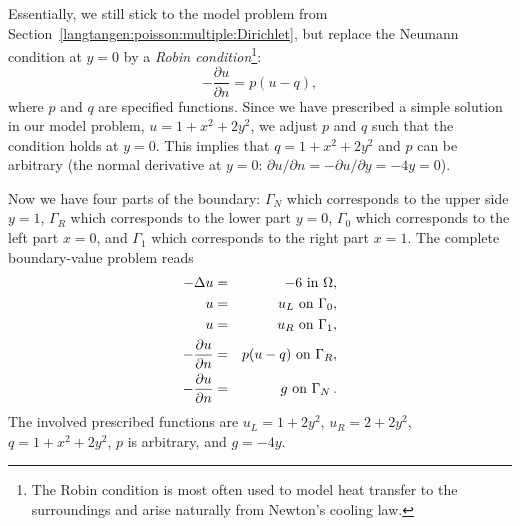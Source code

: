 Essentially, we still stick to the model problem from
Section~\ref{langtangen:poisson:multiple:Dirichlet}, but replace the
Neumann condition at $y=0$ by a \emph{Robin condition}\footnote{The Robin condition is
most often used to model heat transfer to the surroundings and arise
naturally from Newton's cooling law.}:
\[ - \frac{\partial u}{\partial n} = p(u-q),\]
where $p$ and $q$ are specified functions.
Since we have prescribed a simple solution in our model problem,
$u=1+x^2+2y^2$, we adjust $p$ and $q$ such that the condition holds
at $y=0$. This implies that $q=1+x^2+2y^2$ and $p$ can be arbitrary
(the normal derivative at $y=0$: $\partial u/\partial n = -\partial u/\partial y = -4y=0$).

Now we have four parts of the boundary: $\Gamma_N$ which corresponds to
the upper side $y=1$, $\Gamma_R$ which corresponds to the lower part
$y=0$, $\Gamma_0$ which corresponds to the left part $x=0$, and
$\Gamma_1$ which corresponds to the right part $x=1$. The
complete boundary-value problem reads
\begin{eqnarray}
    - \Delta u &=& -6 \mbox{ in } \Omega, \label{langtangen:poisson:2D:DN3}\\
    u &=& u_L \mbox{ on } \Gamma_0, \label{langtangen:poisson:2D:DN3:bc1}\\
    u &=& u_R \mbox{ on } \Gamma_1, \label{langtangen:poisson:2D:DN3:bc2}\\
    - \frac{\partial u}{\partial n} &=& p(u-q) \mbox{ on } \Gamma_R,
    \label{langtangen:poisson:2D:DN3:bc3}\\
    - \frac{\partial u}{\partial n} &=& g \mbox{ on } \Gamma_N\thinspace .
    \label{langtangen:poisson:2D:DN3:bc4}
\end{eqnarray}
The involved prescribed functions are $u_L= 1 + 2y^2$,
$u_R = 2 + 2y^2$, $q=1+x^2+2y^2$, $p$ is arbitrary, and $g=-4y$.

